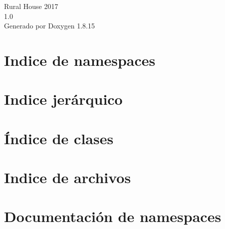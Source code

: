 \let\mypdfximage\pdfximage\def\pdfximage{\immediate\mypdfximage}\documentclass[twoside]{book}
\newcommand{\+}{\discretionary{\mbox{\scriptsize$\hookleftarrow$}}{}{}}
\newcommand{\clearemptydoublepage}{%
  \newpage{\pagestyle{empty}\cleardoublepage}%
}
\begin{document}
\hypersetup{pageanchor=false,
             bookmarksnumbered=true,
             pdfencoding=unicode
            }
\begin{titlepage}
\vspace*{7cm}
\begin{center}%
{\Large Rural House 2017 \\[1ex]\large 1.\+0 }\\
\vspace*{1cm}
{\large Generado por Doxygen 1.8.15}\\
\end{center}
\end{titlepage}
\clearemptydoublepage
{}
\tableofcontents
\clearemptydoublepage
{}
\hypersetup{pageanchor=true}

\chapter{Indice de namespaces}

\chapter{Indice jerárquico}

\chapter{Índice de clases}

\chapter{Indice de archivos}

\chapter{Documentación de namespaces}







\end{document}
